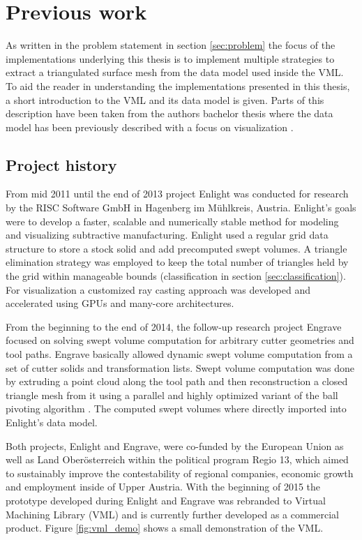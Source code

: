 \chapter{Previous work}
\label{ch:previous_work}

As written in the problem statement in section \ref{sec:problem} the focus of the implementations underlying this thesis is to implement multiple strategies to extract a triangulated surface mesh from the data model used inside the VML.
To aid the reader in understanding the implementations presented in this thesis, a short introduction to the VML and its data model is given.
Parts of this description have been taken from the authors bachelor thesis where the data model has been previously described with a focus on visualization \cite{bachelor}.

\section{Project history}
\label{sec:project_history}

From mid 2011 until the end of 2013 project Enlight was conducted for research by the RISC Software GmbH in Hagenberg im Mühlkreis, Austria.
Enlight's goals were to develop a faster, scalable and numerically stable method for modeling and visualizing subtractive manufacturing.
Enlight used a regular grid data structure to store a stock solid and add precomputed swept volumes.
A triangle elimination strategy was employed to keep the total number of triangles held by the grid within manageable bounds (\cf classification in section \ref{sec:classification}).
For visualization a customized ray casting approach was developed \cite{enlight} and accelerated using GPUs and many-core architectures.

From the beginning to the end of 2014, the follow-up research project Engrave focused on solving swept volume computation for arbitrary cutter geometries and tool paths.
Engrave basically allowed dynamic swept volume computation from a set of cutter solids and transformation lists.
Swept volume computation was done by extruding a point cloud along the tool path and then reconstruction a closed triangle mesh from it using a parallel and highly optimized variant of the ball pivoting algorithm 
\cite{engrave}.
The computed swept volumes where directly imported into Enlight's data model.

Both projects, Enlight and Engrave, were co-funded by the European Union as well as Land Oberösterreich within the political program Regio 13, which aimed to sustainably improve the contestability of regional companies, economic growth and employment inside of Upper Austria.
%
With the beginning of 2015 the prototype developed during Enlight and Engrave was rebranded to Virtual Machining Library (VML) and is currently further developed as a commercial product.
Figure \ref{fig:vml_demo} shows a small demonstration of the VML.

